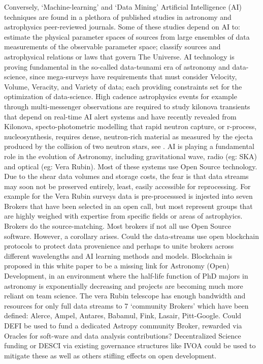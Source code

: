 \documentclass[final,5p,times,twocolumn,authoryear]{elsarticle}
\begin{document}
Conversely,  `Machine-learning' and `Data Mining' Artificial Intelligence (AI) techniques are found in a plethora of published studies in astronomy and astrophysics peer-reviewed journals. Some of these studies depend on AI to: estimate the physical parameter spaces of sources from large ensembles of data measurements of the observable parameter space; classify sources and astrophysical relations or laws that govern The Universe. AI technology is proving fundamental in the so-called data-tsunami era of astronomy and data-science, since mega-surveys have requirements that must consider Velocity, Volume, Veracity, and Variety of data; each providing constraints set for the optimization of data-science. High cadence astrophysics events for example through multi-messenger observations are required to study kilonova transients that depend on real-time AI alert systems and have recently revealed from Kilonova, specto-photometric modelling that rapid neutron capture, or r-process, nucleosynthesis, requires dense, neutron-rich material as measured by  the ejecta produced by the collision of two neutron stars, see \cite{artola2020}. AI is playing a fundamental role in the evolution of Astronomy, including gravitational wave, radio (eg: SKA) and optical (eg: Vera Rubin). Most of these systems use Open Source technology. Due to the shear data volumes and storage costs, the fear is that data streams may soon not be preserved entirely, least, easily accessible for reprocessing. For example for the Vera Rubin surveys data is pre-processsed is injested into seven Brokers that have been selected in an open call, but most represent groups that are highly weighed with expertise from specific fields or areas of astrophyics. Brokers do the source-matching. Most brokers if not all use Open Source software. However, a corollary arises. Could the data-streams use open blockchain protocols to protect data provenience and perhaps to unite brokers across different wavelengths and AI learning methods and models. Blockchain is proposed in this white paper to be a missing link for Astronomy (Open) Development, in an environment where the half-life function of PhD majors in astronomy is exponentially decreasing and projects are becoming much more reliant on team science.  The vera Rubin telescope has enough bandwidth and resources for only full data streams to 7 `community Brokers' which have been defined: Alerce, Ampel, Antares, Babamul, Fink, Lasair, Pitt-Google. Could DEFI be used to fund a dedicated Astropy community Broker, rewarded via Oracles for soft-ware and data analysis contributions? Decentralized Science funding or DESCI via existing governance structures like IVOA could be used to mitigate these as well as others stifling effects  on open development. 
\end{document}
